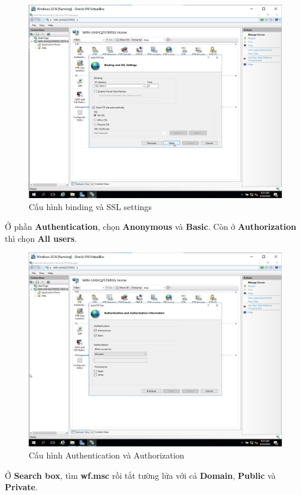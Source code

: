 \begin{figure}[!htb]
    \centering
    \includegraphics[width=0.8\linewidth]{figure//chapter9//lab9_2/ssl_settings.png}
    \caption{Cấu hình binding và SSL settings}
    \label{fig:enter-label}
\end{figure}

 Ở phần \textbf{Authentication}, chọn \textbf{Anonymous} và \textbf{Basic}. Còn ở \textbf{Authorization} thì chọn \textbf{All users}.

\begin{figure}[!htb]
    \centering
    \includegraphics[width=0.8\linewidth]{figure//chapter9//lab9_2/auth.png}
    \caption{Cấu hình Authentication và Authorization}
    \label{fig:enter-label}
\end{figure}

\newpage

 Ở \textbf{Search box}, tìm \textbf{wf.msc} rồi tắt tường lửa với cả \textbf{Domain}, \textbf{Public} và \textbf{Private}.

